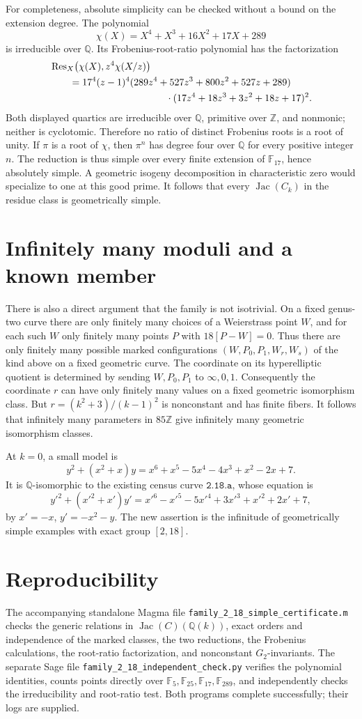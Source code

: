 \documentclass[11pt]{article}
\newcommand{\Q}{\mathbb Q}
\newcommand{\F}{\mathbb F}
\newcommand{\Z}{\mathbb Z}
\newcommand{\Jac}{\operatorname{Jac}}
\begin{document}
For completeness, absolute simplicity can be checked without a
bound on the extension degree. The polynomial
\[
 \chi(X)=X^4+X^3+16X^2+17X+289
\]
is irreducible over $\Q$. Its Frobenius-root-ratio polynomial has
the factorization
\begin{align*}
 &\operatorname{Res}_X\bigl(\chi(X),z^4\chi(X/z)\bigr)\\
 &\qquad=17^4(z-1)^4
 (289z^4+527z^3+800z^2+527z+289)\\
 &\hspace{42mm}\cdot(17z^4+18z^3+3z^2+18z+17)^2.
\end{align*}
Both displayed quartics are irreducible over $\Q$, primitive over
$\Z$, and nonmonic; neither is cyclotomic. Therefore no ratio of
distinct Frobenius roots is a root of unity. If $\pi$ is a root of
$\chi$, then $\pi^n$ has degree four over $\Q$ for every positive
integer $n$. The reduction is thus simple over every finite
extension of $\F_{17}$, hence absolutely simple. A geometric
isogeny decomposition in characteristic zero would specialize to
one at this good prime. It follows that every $\Jac(C_k)$ in the
residue class is geometrically simple.

\section{Infinitely many moduli and a known member}
There is also a direct argument that the family is not isotrivial.
On a fixed genus-two curve there are only finitely many choices
of a Weierstrass point $W$, and for each such $W$ only finitely
many points $P$ with $18[P-W]=0$. Thus there are only finitely many
possible marked configurations $(W,P_0,P_1,W_r,W_s)$ of the kind
above on a fixed geometric curve. The coordinate on its
hyperelliptic quotient is determined by sending $W,P_0,P_1$ to
$\infty,0,1$. Consequently the coordinate $r$ can have only
finitely many values on a fixed geometric isomorphism class.
But $r=(k^2+3)/(k-1)^2$ is nonconstant and has finite fibers.
It follows that infinitely many parameters in $85\Z$ give
infinitely many geometric isomorphism classes.

At $k=0$, a small model is
\[
 y^2+(x^2+x)y=x^6+x^5-5x^4-4x^3+x^2-2x+7.
\]
It is $\Q$-isomorphic to the existing census curve $\texttt{2.18.a}$,
whose equation is
\[
 y'^2+(x'^2+x')y'=x'^6-x'^5-5x'^4+3x'^3+x'^2+2x'+7,
\]
by $x'=-x$, $y'=-x^2-y$. The new assertion is the infinitude of
geometrically simple examples with exact group $[2,18]$.

\section{Reproducibility}
The accompanying standalone Magma file
\texttt{family\_2\_18\_simple\_certificate.m} checks the generic
relations in $\Jac(C)(\Q(k))$, exact orders and independence of
the marked classes, the two reductions, the Frobenius calculations,
the root-ratio factorization, and nonconstant $G_2$-invariants.
The separate Sage file
\texttt{family\_2\_18\_independent\_check.py} verifies the polynomial
identities, counts points directly over $\F_5,\F_{25},\F_{17},\F_{289}$,
and independently checks the irreducibility and root-ratio test.
Both programs complete successfully; their logs are supplied.
\end{document}
